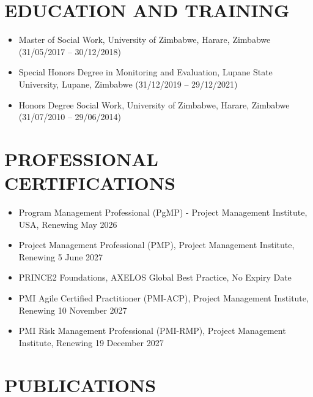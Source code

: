 \documentclass[
  10pt,
]{article}
\begin{document}
\vspace{0.5cm}


\section{EDUCATION AND TRAINING}\label{education-and-training}

\begin{itemize}[itemsep=0.25em, topsep=0.25em]

\item Master of Social Work, University of Zimbabwe, Harare, Zimbabwe (31/05/2017 – 30/12/2018)

\item Special Honors Degree in Monitoring and Evaluation, Lupane State University, Lupane, Zimbabwe (31/12/2019 – 29/12/2021) 
  
\item Honors Degree Social Work, University of Zimbabwe, Harare, Zimbabwe (31/07/2010 – 29/06/2014)
\end{itemize}

\vspace{0.5cm}

\section{PROFESSIONAL CERTIFICATIONS}\label{professional-certifications}

\begin{itemize}[itemsep=0.25em, topsep=0.25em]
  \item Program Management Professional (PgMP) - Project Management Institute, USA, Renewing May 2026  
  \item Project Management Professional (PMP), Project Management Institute, Renewing 5 June 2027  
  \item PRINCE2 Foundations, AXELOS Global Best Practice, No Expiry Date  
  \item PMI Agile Certified Practitioner (PMI-ACP), Project Management Institute, Renewing 10 November 2027  
  \item PMI Risk Management Professional (PMI-RMP), Project Management Institute, Renewing 19 December 2027
\end{itemize}

\vspace{0.5cm}

\section{PUBLICATIONS}\label{publications}
\end{document}
